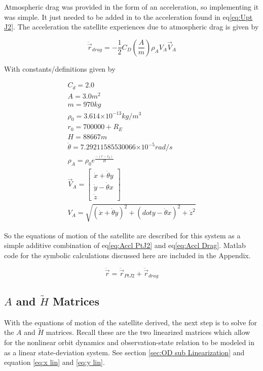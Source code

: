 \documentclass[12pt,a4paper,oneside]{article}
\numberwithin{equation}{section}   		%
\providecommand{\e}[1]{\ensuremath{\times 10^{#1}}}
\newcommand{\parens} [1] {\left(  #1  \right)}
\newcommand{\brackets} [1] {\left[ #1 \right]}
\newcommand{\arrayb}[2]{\brackets{ \begin{array}{#1}  #2 \end{array} } }
\begin{document}
Atmospheric drag was provided in the form of an acceleration, so implementing it was simple. It just needed to be added in to the acceleration found in eq\eqref{eq:Upt J2}. The acceleration the satellite experiences due to atmospheric drag is given by

\begin{equation}
	 \ddot{\vec{r}}_{drag} = -\frac{1}{2}C_D \parens{\frac{A}{m}} \rho_A V_A \vec{V}_A
	\label{eq:Accl Drag}
\end{equation}

With constants/definitions given by

\begin{align*}
	C_d = 2.0								\\
	A = 3.0 m^2							\\
	m = 970 kg							\\
	\rho_0 = 3.614\e{-13} kg/m^3 				\\
	r_0 = 700000 + R_E 					\\
	H = 88667 m							\\
	\dot{\theta} = 7.29211585530066\e{-5} rad/s 	\\
	\rho_A = \rho_0 e^{\frac{-(r-r_0)}{H}}			\\
	\vec{V}_A = \arrayb{c}{ \dot{x} + \dot{\theta}y 
					\\ \dot{y} - \dot{\theta}x 
					\\ \dot{z}} 				\\
	V_A = \sqrt{(\dot{x} + \dot{\theta}y )^2 + (dot{y} - \dot{\theta}x)^2 + \dot{z}^2}
\end{align*}

So the equations of motion of the satellite are described for this system as a simple additive combination of eq\eqref{eq:Accl PtJ2} and eq\eqref{eq:Accl Drag}. Matlab code for the symbolic calculations discussed here are included in the Appendix. 

\begin{equation}
	 \ddot{\vec{r}} = \ddot{\vec{r}}_{PtJ2} + \ddot{\vec{r}}_{drag}
	\label{eq:Accl PtJ2Drag}
\end{equation}





\subsection{$A$ and $\tilde{H}$ Matrices}
\label{sec:A Htilde}
With the equations of motion of the satellite derived, the next step is to solve for the $A$ and $\tilde{H}$ matrices. Recall these are the two linearized matrices which allow for the nonlinear orbit dynamics and observation-state relation to be modeled in as a linear state-deviation system. See section \ref{sec:OD sub Linearization} and equation \eqref{eq:x lin} and \eqref{eq:y lin}.
\end{document}
